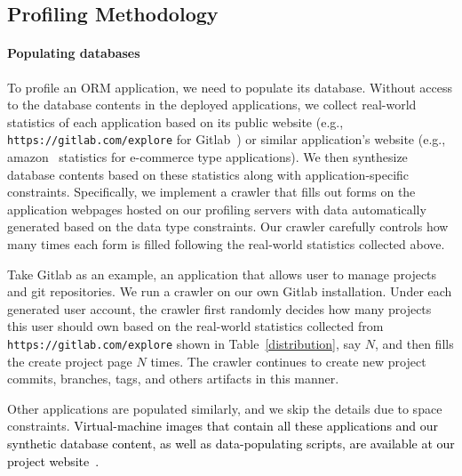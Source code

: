 \subsection{Profiling Methodology}
\label{sec:meth_profile}

\paragraph{\bf Populating databases}
To profile an ORM application, we need to populate its database. Without access to the database contents in the deployed applications, we collect real-world statistics of each application based on its public website (e.g., 
{\tt https://gitlab.com/explore} for Gitlab~\cite{gitlab}) or similar application's website (e.g., amazon~\cite{amazon} statistics for e-commerce type applications). 
We then synthesize database contents based on these statistics along with application-specific constraints.
Specifically, we implement a crawler that fills out forms on the application webpages hosted on our profiling servers with data automatically generated based on the data type constraints. Our crawler carefully controls how many times each form is filled following the real-world statistics collected above.

Take Gitlab as an example, an application that allows user to manage projects and git repositories. We run a crawler on our own Gitlab installation. Under each generated user account, the crawler first randomly decides how many projects this user should own based on the real-world statistics collected from {\tt https://gitlab.com/explore} shown in Table~\ref{distribution}, say $N$, and then fills the create project page $N$ times. The crawler continues to create new project commits, branches, tags, and others artifacts in this manner.



Other applications are populated similarly, and we skip the details due to space constraints. \textcolor{black}{Virtual-machine images that contain all these applications and our synthetic database content, as well as data-populating scripts, are available at our project website~\cite{website}.} 




